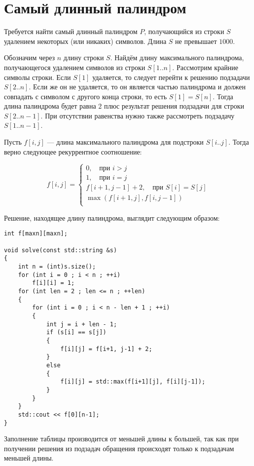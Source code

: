 \documentclass[14pt,openany]{book}
\begin{document}
\section{Самый длинный палиндром}

Требуется найти самый длинный палиндром $P$, получающийся из строки $S$ удалением некоторых
(или никаких) символов. Длина $S$ не превышает $1000$.

Обозначим через $n$ длину строки $S$. Найдём длину максимального палиндрома, получающегося
удалением символов из строки $S[1..n]$. Рассмотрим крайние символы строки.
Если $S[1]$ удаляется, то следует перейти к решению подзадачи $S[2..n]$. Если же он
не удаляется, то он является частью палиндрома и должен совпадать с символом с другого конца
строки, то есть $S[1] = S[n]$. Тогда длина палиндрома будет равна $2$ плюс результат
решения подзадачи для строки $S[2..n-1]$. При отсутствии равенства нужно также рассмотреть
подзадачу $S[1..n-1]$.

Пусть $f[i,j]$ --- длина максимального палиндрома для подстроки $S[i..j]$. Тогда верно
следующее рекуррентное соотношение:

$$
  f[i,j] = \left\{\begin{array}{l}
      0, \quad \text{при $i > j$} \\
      1, \quad \text{при $i = j$} \\
      f[i+1, j-1] + 2, \quad \text{при $S[i] = S[j]$} \\
      \max(f[i+1, j], f[i, j-1]) \\
  \end{array}\right.
$$

Решение, находящее длину палиндрома, выглядит следующим образом:

\begin{lstlisting}
int f[maxn][maxn];

void solve(const std::string &s)
{
    int n = (int)s.size();
    for (int i = 0 ; i < n ; ++i)
        f[i][i] = 1;
    for (int len = 2 ; len <= n ; ++len)
    {
        for (int i = 0 ; i < n - len + 1 ; ++i)
        {
            int j = i + len - 1;
            if (s[i] == s[j])
            {
                f[i][j] = f[i+1, j-1] + 2;
            }
            else
            {
                f[i][j] = std::max(f[i+1][j], f[i][j-1]);
            }
        }
    }
    std::cout << f[0][n-1];
}
\end{lstlisting}

Заполнение таблицы производится от меньшей длины к большей, так как
при получении решения из подзадач обращения происходят только к подзадачам
меньшей длины.
\end{document}
